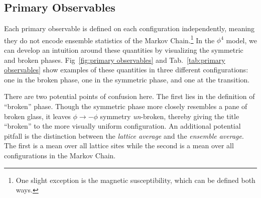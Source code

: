 \subsection{Primary Observables}
\label{sec:primary observables}
Each primary observable is defined on each configuration independently, meaning they do not encode ensemble statistics of the Markov Chain.\footnote{One slight exception is the magnetic susceptibility, which can be defined both ways.} In the $\phi^4$ model, we can develop an intuition around these quantities by visualizing the symmetric and broken phases. Fig~\ref{fig:primary observables} and Tab.~\ref{tab:primary observables} show examples of these quantities in three different configurations: one in the broken phase, one in the symmetric phase, and one at the transition. 

There are two potential points of confusion here. The first lies in the definition of ``broken'' phase. Though the symmetric phase more closely resembles a pane of broken glass, it leaves $\phi\rightarrow-\phi$ symmetry \textit{un}-broken, thereby giving the title ``broken'' to the more visually uniform configuration. An additional potential pitfall is the distinction between the \textit{lattice average} and the \textit{ensemble average}. The first is a mean over all lattice sites while the second is a mean over all configurations in the Markov Chain.

